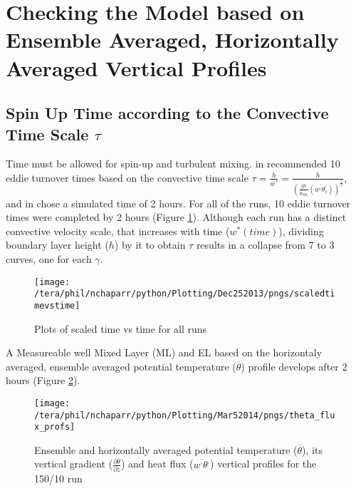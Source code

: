 \section{Checking the Model based on Ensemble Averaged, Horizontally Averaged Vertical Profiles}
\label{sec:CheckingtheModel}
\subsection{Spin Up Time according to the Convective Time Scale $\tau$}
\FloatBarrier

Time must be allowed for spin-up and turbulent mixing.  \citeauthor{SullMoengStev} in \cite{SullMoengStev}
recommended 10 eddie turnover times based on the convective time scale $\tau = \frac{h}{w^{*}} = \frac{h}{ \left( \frac{gh}{\overline{\theta}_{ML}}(\overline{w^{,} \theta^{,}_{s}}) \right)^{\frac{1}{3}} } $, 
and \citeauthor{BrooksFowler2} in \cite{BrooksFowler2} chose a simulated time of 2 hours.  For all of the runs, 10 eddie 
turnover times were completed by 2 hours (Figure \ref{fig:ScaledTimevsTime}).  Although each run has a distinct
convective velocity scale, that increases with time ($w^{*}(time)$), dividing boundary layer height ($h$) by it
to obtain $\tau$ results in a collapse from 7 to 3 curves, one for each $\gamma$.\\


\begin{figure}[!h]
    \centering
    \texttt{[image: /tera/phil/nchaparr/python/Plotting/Dec252013/pngs/scaledtimevstime]}
    \caption{Plots of scaled time vs time for all runs}
    \label{fig:ScaledTimevsTime}   
\end{figure}

A Measureable well Mixed Layer (\acs{ML}) and \acs{EL} based on the horizontaly averaged, ensemble averaged
potential temperature ($\overline{\theta}$) profile develops after 2 hours (Figure \ref{fig:tempgradfluxprofs15010}).\\

\begin{figure}[htbp]
    \centering
    \texttt{[image: /tera/phil/nchaparr/python/Plotting/Mar52014/pngs/theta\_flux\_profs]}
    \caption{Ensemble and horizontally averaged potential temperature ($\overline{\theta}$), its vertical gradient ($\frac{\partial \overline{\theta}}{\partial z}$)  and heat flux ($\overline{w^{,}\theta^{,}}$) vertical profiles for the 150/10 run}
    \label{fig:tempgradfluxprofs15010}   %
\end{figure}

